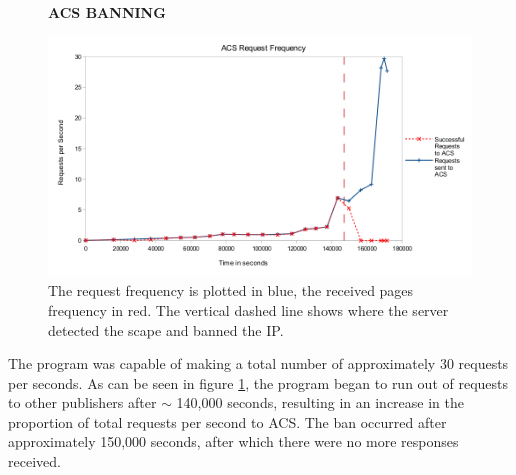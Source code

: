 \begin{figure}[H]
    \centering
    \textbf{ACS BANNING}\par\medskip
    \includegraphics[width=\textwidth]{Data_Acquisition/ACS_crash_line.png}
    \caption{The request frequency is plotted in blue, the received pages frequency in red. The vertical dashed line shows where the server detected the scape and banned the IP.}
     \label{fig:ACSBAN}
\end{figure}
The program was capable of making a total number of approximately 30 requests per seconds. As can be seen in figure \ref{fig:ACSBAN}, the program began to run out of requests to other publishers after $\sim$ 140,000 seconds, resulting in an increase in the proportion of total requests per second to ACS. The ban occurred after approximately 150,000 seconds, after which there were no more responses received.
